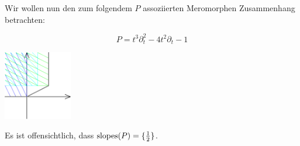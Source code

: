Wir wollen nun den zum folgendem $P$ assoziierten Meromorphen Zusammenhang
betrachten:\\
\begin{minipage}[hbt]{0,49\textwidth}
  \[ P= t^3\partial_t^2-4t^2\partial_t-1 \]
\end{minipage}
\begin{minipage}[hbt]{0,49\textwidth}
  \begin{center}
    \includegraphics[width=3cm]{beispiele/img/formal_b.png}
  \end{center}
\end{minipage}
Es ist offensichtlich, dass $\operatorname{slopes}(P)=\{\frac{1}{2}\}$.

